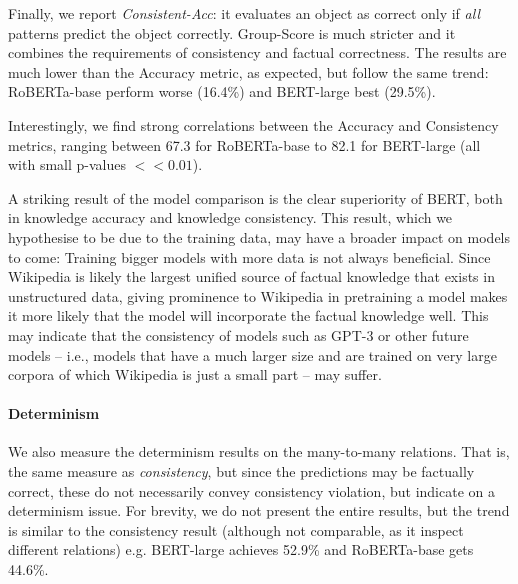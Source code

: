 Finally, we report
\emph{Consistent-Acc}: it evaluates an object as correct only
if \emph{all} patterns predict the object
correctly. Group-Score is much stricter and it combines  the
requirements
of consistency and factual correctness.
The results are much lower than the Accuracy metric, as expected,
but follow the same trend: RoBERTa-base perform worse (16.4\%) and BERT-large  best  (29.5\%).

Interestingly, we find strong correlations between the Accuracy and Consistency metrics, ranging between 67.3 for RoBERTa-base to 82.1 for BERT-large (all with small p-values $<<0.01$).




A striking result of the model comparison is
the clear superiority of
BERT, both in knowledge accuracy and knowledge
consistency. This result, which we hypothesise to be due to
the training data, may have a broader impact on models to
come: Training bigger models with more data is not always
beneficial. Since Wikipedia is likely the largest unified source
of factual knowledge that exists in unstructured data,
giving prominence to Wikipedia in pretraining a model makes it more
likely that the model will incorporate the factual knowledge
well. 
This may indicate that  the consistency of models such as GPT-3 \cite{gpt3}
or other future models -- i.e., models that
have a much larger size and
are trained on very large corpora of
which Wikipedia is just a small part -- may suffer.



\paragraph{Determinism}
We also measure the determinism results on the many-to-many relations. That is, the same measure as \textit{consistency}, but since the predictions may be factually correct, these do not necessarily convey consistency violation, but indicate on a determinism issue. For brevity, we do not present the entire results, but the trend is similar to the consistency result (although not comparable, as it inspect different relations)
e.g. BERT-large achieves 52.9\% and RoBERTa-base gets 44.6\%.



